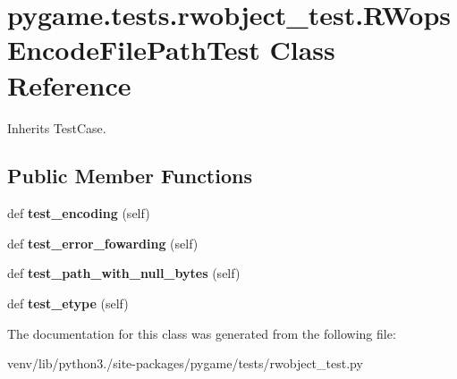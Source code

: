 \hypertarget{classpygame_1_1tests_1_1rwobject__test_1_1_r_wops_encode_file_path_test}{}\section{pygame.\+tests.\+rwobject\+\_\+test.\+R\+Wops\+Encode\+File\+Path\+Test Class Reference}
\label{classpygame_1_1tests_1_1rwobject__test_1_1_r_wops_encode_file_path_test}


Inherits Test\+Case.

\subsection*{Public Member Functions}
\begin{DoxyCompactItemize}
\item 
\mbox{\label{classpygame_1_1tests_1_1rwobject__test_1_1_r_wops_encode_file_path_test_a9e5aefc3eb85b593cb0a13fd72a77e39}} 
def {\bfseries test\+\_\+encoding} (self)
\item 
\mbox{\label{classpygame_1_1tests_1_1rwobject__test_1_1_r_wops_encode_file_path_test_ade80fd24fd02c9a7d6f94ba58c02b834}} 
def {\bfseries test\+\_\+error\+\_\+fowarding} (self)
\item 
\mbox{\label{classpygame_1_1tests_1_1rwobject__test_1_1_r_wops_encode_file_path_test_a10071bae08c7a3027b424cdfa4eba5b6}} 
def {\bfseries test\+\_\+path\+\_\+with\+\_\+null\+\_\+bytes} (self)
\item 
\mbox{\label{classpygame_1_1tests_1_1rwobject__test_1_1_r_wops_encode_file_path_test_a2d36f8072ffee21243caf6f6a6f1bf76}} 
def {\bfseries test\+\_\+etype} (self)
\end{DoxyCompactItemize}


The documentation for this class was generated from the following file\+:\begin{DoxyCompactItemize}
\item 
venv/lib/python3./site-\/packages/pygame/tests/rwobject\+\_\+test.\+py\end{DoxyCompactItemize}
